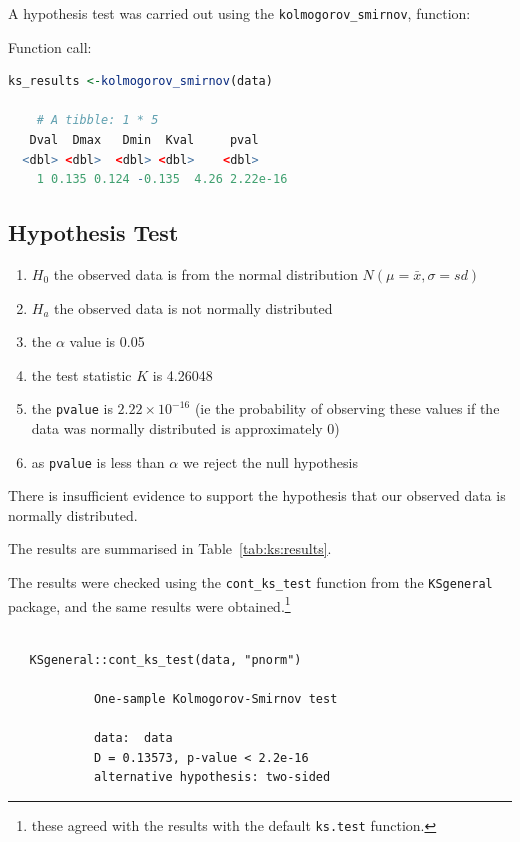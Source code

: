 \documentclass[12pt,letterpaper]{article}
\begin{document}
	A hypothesis test was carried out using the \texttt{kolmogorov\_smirnov}, function:

	Function call:

	\begin{lstlisting}[language=R]
	ks_results <-kolmogorov_smirnov(data)

	# A tibble: 1 * 5
   Dval  Dmax   Dmin  Kval     pval
  <dbl> <dbl>  <dbl> <dbl>    <dbl>
	1 0.135 0.124 -0.135  4.26 2.22e-16

	\end{lstlisting}

	\subsection*{Hypothesis Test}

	\begin{enumerate}
		\item $H_0$ the observed data is from the normal distribution $N(\mu=\bar{x}, \sigma = sd)$
		\item $H_a$ the observed data is not normally distributed
		\item the $\alpha$ value is 0.05
		\item the test statistic $K$ is 4.26048
		\item the \texttt{pvalue} is $2.22 \times 10^{-16}$ (ie the probability of observing these values if the data was normally distributed is approximately 0)
		\item as \texttt{pvalue} is less than $\alpha$ we reject the null hypothesis
	\end{enumerate}

	There is insufficient evidence to support the hypothesis that our observed data is normally distributed.

  The results are summarised in Table~\ref{tab:ks:results}.

	The results were checked using the \texttt{cont\_ks\_test} function from the \texttt{KSgeneral} package, and the same results were obtained.\footnote{these agreed with the results with the default \texttt{ks.test} function.}
  \begin{lstlisting}

   KSgeneral::cont_ks_test(data, "pnorm")

			One-sample Kolmogorov-Smirnov test

			data:  data
			D = 0.13573, p-value < 2.2e-16
			alternative hypothesis: two-sided
  \end{lstlisting}
\end{document}
